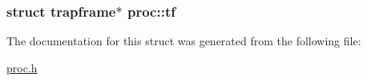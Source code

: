 \subsubsection[{\texorpdfstring{tf}{tf}}]{\setlength{\rightskip}{0pt plus 5cm}struct {\bf trapframe}$\ast$ proc\+::tf}\hypertarget{structproc_a56ec07ac1e10ce42adfc8dd2a366071f}{}\label{structproc_a56ec07ac1e10ce42adfc8dd2a366071f}


The documentation for this struct was generated from the following file\+:\begin{DoxyCompactItemize}
\item 
\hyperlink{proc_8h}{proc.\+h}\end{DoxyCompactItemize}
